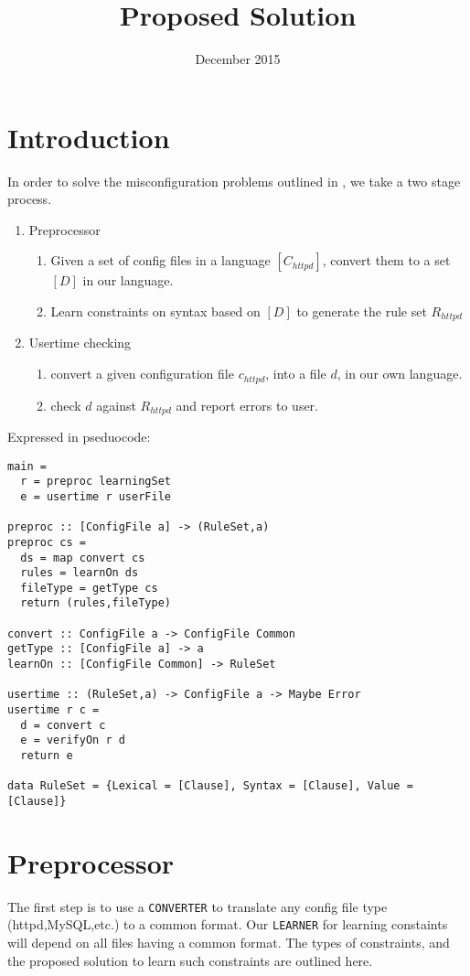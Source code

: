 \documentclass{article}
\title{Proposed Solution}
\author{}
\date{December 2015}
\begin{document}
\maketitle

\section{Introduction}
In order to solve the misconfiguration problems outlined in \cite{yin2011}, we take a two stage process.

\begin{enumerate}
  \item Preprocessor
  \begin{enumerate}
    \item Given a set of config files in a language $[C_{httpd}]$, convert them to a set $[D]$ in our language.
    \item Learn constraints on syntax based on $[D]$ to generate the rule set $R_{httpd}$
  \end{enumerate}
  \item Usertime checking
  \begin{enumerate}
    \item convert a given configuration file $c_{httpd}$, into a file $d$, in our own language.
    \item check $d$ against $R_{httpd}$ and report errors to user.
  \end{enumerate}
\end{enumerate}

Expressed in pseduocode:

\begin{lstlisting}
main = 
  r = preproc learningSet
  e = usertime r userFile

preproc :: [ConfigFile a] -> (RuleSet,a)
preproc cs =
  ds = map convert cs 
  rules = learnOn ds
  fileType = getType cs
  return (rules,fileType)

convert :: ConfigFile a -> ConfigFile Common
getType :: [ConfigFile a] -> a
learnOn :: [ConfigFile Common] -> RuleSet

usertime :: (RuleSet,a) -> ConfigFile a -> Maybe Error
usertime r c =
  d = convert c
  e = verifyOn r d
  return e

data RuleSet = {Lexical = [Clause], Syntax = [Clause], Value = [Clause]}
\end{lstlisting}




\section{Preprocessor}
The first step is to use a \texttt{CONVERTER} to translate any config file type (httpd,MySQL,etc.) to a common format. 
Our \texttt{LEARNER} for learning constaints will depend on all files having a common format. 
The types of constraints, and the proposed solution to learn such constraints are outlined here.
\end{document}
